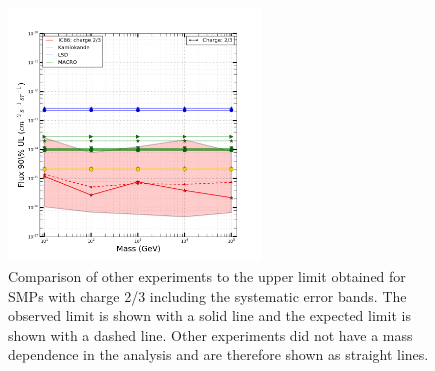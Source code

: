 \begin{figure}
\centering
\includegraphics[width=0.6\textwidth]{chapter8/img/UpperLimitPlot_masses_withunc_0p666666666667}
\caption{Comparison of other experiments to the upper limit obtained for SMPs with charge 2/3 including the systematic error bands. The observed limit is shown with a solid line and the expected limit is shown with a dashed line. Other experiments did not have a mass dependence in the analysis and are therefore shown as straight lines.}
\label{fig:moneyplot4}
\end{figure}


